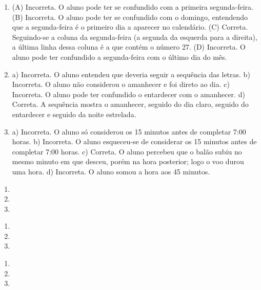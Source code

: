 
\begin{enumerate}
\item
(A) Incorreta. O aluno pode ter se confundido com a primeira segunda-feira.
(B) Incorreta. O aluno pode ter se confundido com o domingo, entendendo que
a segunda-feira é o primeiro dia a aparecer no calendário.
(C) Correta. Seguindo-se a coluna da segunda-feira (a segunda da esquerda para a direita), a última linha dessa coluna é a que contém o número 27.
(D) Incorreta. O aluno pode ter confundido a segunda-feira com o último
dia do mês.

\item
a) Incorreta. O aluno entendeu que deveria seguir a sequência das letras.
b) Incorreta. O aluno não considerou o amanhecer e foi direto ao dia.
c) Incorreta. O aluno pode ter confundido o entardecer com o amanhecer.
d) Correta. A sequência mostra o amanhecer, seguido do dia claro, seguido
do entardecer e seguido da noite estrelada.

\item
a) Incorreta. O aluno só considerou os 15 minutos antes de
completar 7:00 horas.
b) Incorreta. O aluno esqueceu-se de considerar os 15 minutos antes de
completar 7:00 horas.
c) Correta. O aluno percebeu que o balão subiu no mesmo minuto em
que desceu, porém na hora posterior; logo o voo durou uma hora.
d) Incorreta. O aluno somou a hora aos 45 minutos.
\end{enumerate}


\begin{enumerate}
\item

\item

\item
\end{enumerate}


\begin{enumerate}
\item

\item

\item
\end{enumerate}


\begin{enumerate}
\item

\item

\item
\end{enumerate}

